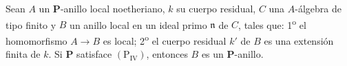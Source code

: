 \begin{lemma}[7.4.4.1]
\label{IV.2.s7.4.4.1-fr}
Sean $A$ un $\boldsymbol P$-anillo local noetheriano, $k$ su
cuerpo residual, $C$ una $A$-álgebra de tipo finito y $B$ un
anillo local en un ideal primo $\mathfrak n$ de $C$, tales que:
1\textsuperscript{o} el homomorfismo $A\to B$ es local;
2\textsuperscript{o} el cuerpo residual $k'$ de $B$ es una
extensión finita de $k$. Si $\boldsymbol P$ satisface
$(\mathrm P_{\mathrm{IV}})$, entonces $B$ es un
$\boldsymbol P$-anillo.
\end{lemma}
